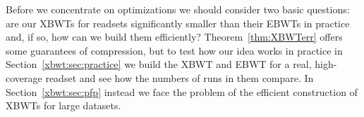 Before we concentrate on optimizations we should consider two basic questions: are our XBWTs for readsets significantly smaller than their EBWTs in practice and, if so, how can we build them efficiently? Theorem~\ref{thm:XBWTerr} offers some guarantees of compression, but to test how our idea works in practice in Section~\ref{xbwt:sec:practice} we build the XBWT and EBWT for a real, high-coverage readset and see how the numbers of runs in them compare. In Section~\ref{xbwt:sec:pfp} instead we face the problem of the efficient construction of XBWTs for large datasets.  